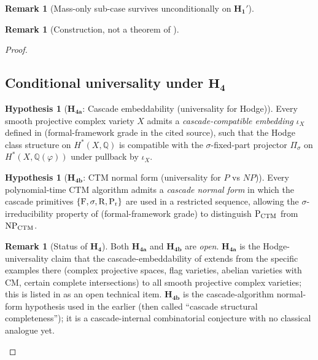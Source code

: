 \documentclass[11pt, a4paper]{amsart}
\theoremstyle{definition}
\newtheorem{remark}[theorem]{Remark}
\newtheorem{hypothesis}[theorem]{Hypothesis}
\newcommand{\Q}{\mathbb{Q}}
\newcommand{\pphi}{\varphi}
\begin{document}
\begin{remark}[Mass-only sub-case survives unconditionally on $\mathbf{H_1'}$]
\begin{remark}[Construction, not a theorem of \cite{CascadeEmbeddings}]
\begin{proof}
\subsection{Conditional universality under $\mathbf{H_4}$}
\label{subsec:H4}

\begin{hypothesis}[$\mathbf{H_{4a}}$: Cascade embeddability
(universality for Hodge)]
\label{hyp:H4a}
Every smooth projective complex variety $X$ admits a
\emph{cascade-compatible embedding} $\iota_X$ defined in
\cite[\S 4--6]{CascadeEmbeddings} (formal-framework grade in the
cited source), such that the Hodge class structure on
$H^*(X, \Q)$ is compatible with the $\sigma$-fixed-part projector
$\Pi_\sigma$ on $H^*(X, \Q(\pphi))$ under pullback by $\iota_X$.
\end{hypothesis}

\begin{hypothesis}[$\mathbf{H_{4b}}$: CTM normal form (universality
for $P$ vs $NP$)]
\label{hyp:H4b}
Every polynomial-time CTM algorithm admits a \emph{cascade normal
form} in which the cascade primitives $\{\rm F, \sigma, R, P_r\}$
are used in a restricted sequence, allowing the $\sigma$-irreducibility
property of \cite[\S D5--D10]{CascadeDynamics} (formal-framework
grade) to distinguish $\mathrm{P}_{\rm CTM}$ from $\mathrm{NP}_{\rm CTM}$.
\end{hypothesis}

\begin{remark}[Status of $\mathbf{H_4}$]
Both $\mathbf{H_{4a}}$ and $\mathbf{H_{4b}}$ are \emph{open}.
$\mathbf{H_{4a}}$ is the Hodge-universality claim that the
cascade-embeddability of \cite[\S 6]{CascadeEmbeddings} extends from
the specific examples there (complex projective spaces, flag
varieties, abelian varieties with CM, certain complete
intersections) to all smooth projective complex varieties; this is
listed in \cite[\S MP5]{CascadeMillennium} as an open technical
item. $\mathbf{H_{4b}}$ is the cascade-algorithm normal-form
hypothesis used in the earlier \cite{MillenniumPNP} (then called
``cascade structural completeness''); it is a cascade-internal
combinatorial conjecture with no classical analogue yet.
\end{remark}


\end{proof}
\end{remark}
\end{remark}
\end{document}
